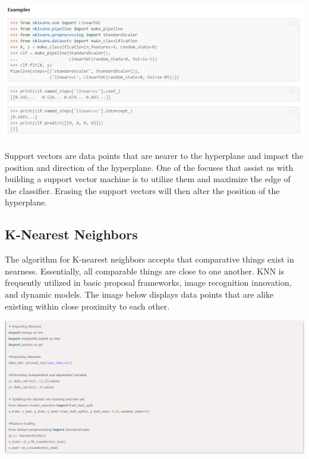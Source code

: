 \documentclass[a4paper,12pt]{report}
\begin{document}
\begin{center}
    \captionsetup{type=figure}
    \includegraphics[width=.9\linewidth]{media/scalarpipeline.png}
\end{center}

Support vectors are data points that are nearer to the hyperplane and impact the position and direction of the hyperplane. One of the focuses that assist us with building a support vector machine is to utilize them and maximize the edge of the classifier. Erasing the support vectors will then alter the position of the hyperplane.

\subsection{K-Nearest Neighbors}
 
The algorithm for K-nearest neighbors accepts that comparative things exist in nearness. Essentially, all comparable things are close to one another. KNN is frequently utilized in basic proposal frameworks, image recognition innovation, and dynamic models. The image below displays data points that are alike existing within close proximity to each other.

\begin{center}
    \captionsetup{type=figure}
    \includegraphics[width=.9\linewidth]{media/Knearestcode.png}
\end{center}
\end{document}
